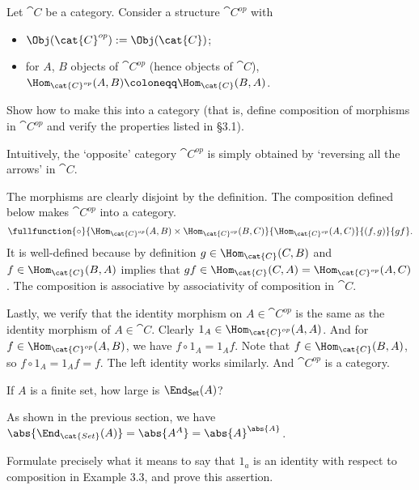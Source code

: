 \documentclass[parskip=full, draft]{scrartcl}
\begin{document}
\begin{prob}{1}
    Let \(\cat{C}\) be a category. Consider a structure \(\cat{C}^{op}\) with
    \begin{itemize}
        \item \(\Obj(\cat{C}^{op}) := \Obj(\cat{C})\);
        \item for \(A\), \(B\) objects of \(\cat{C}^{op}\) (hence objects of \(\cat{C}\)), \(\Hom_{\cat{C}^{op}}(A, B) \coloneqq \Hom_{\cat{C}}(B, A)\).
    \end{itemize}

    Show how to make this into a category (that is, define composition of morphisms in \(\cat{C}^{op}\) and verify the properties listed in \S3.1).

    Intuitively, the `opposite' category \(\cat{C}^{op}\) is simply obtained by `reversing all the arrows' in \(\cat{C}\).
\end{prob}
\begin{sol}
    The morphisms are clearly disjoint by the definition. The composition defined below makes \(\cat{C}^{op}\) into a category.
    \[
        \fullfunction{\circ}{\Hom_{\cat{C}^{op}}(A, B) \times \Hom_{\cat{C}^{op}}(B, C)}{\Hom_{\cat{C}^{op}}(A, C)}{(f, g)}{gf}.
    \]
    It is well-defined because by definition \(g \in \Hom_{\cat{C}}(C, B)\) and \(f \in \Hom_{\cat{C}}(B, A)\) implies that \(gf \in \Hom_{\cat{C}}(C, A) = \Hom_{\cat{C}^{op}}(A, C)\). The composition is associative by associativity of composition in \(\cat{C}\).

    Lastly, we verify that the identity morphism on \(A \in \cat{C^{op}}\) is the same as the identity morphism of \(A \in \cat{C}\). Clearly \(1_A \in \Hom_{\cat{C}^{op}}(A, A)\). And for \(f \in \Hom_{\cat{C}^{op}}(A, B)\), we have \(f \circ 1_A = 1_A f\). Note that \(f \in \Hom_{\cat{C}}(B, A)\), so \(f \circ 1_A = 1_A f = f\). The left identity works similarly. And \(\cat{C}^{op}\) is a category.
\end{sol}
\begin{prob}{2}
    If \(A\) is a finite set, how large is \(\End_{\mathsf{Set}}(A)\)?
\end{prob}
\begin{sol}
    As shown in the previous section, we have \(\abs{\End_{\cat{Set}}(A)} = \abs{A^A} = \abs{A}^{\abs{A}}\).
\end{sol}
\begin{prob}{3}
    Formulate precisely what it means to say that \(1_a\) is an identity with respect to composition in Example 3.3, and prove this assertion.
\end{prob}
\end{document}
